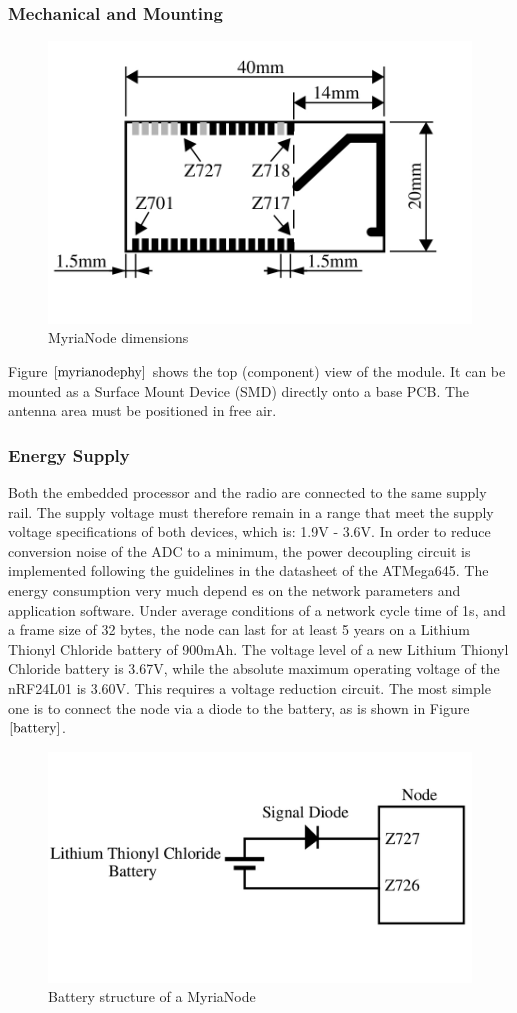 \documentclass[a4paper,10pt]{report}
\begin{document}
\subsubsection{Mechanical and Mounting}
\begin{figure}[!h]
 \centering
 \includegraphics[width= 0.7 \textwidth]{myrianodephy}
 \caption{MyriaNode dimensions}
 \label{myrianodephy}
\end{figure}
Figure $\ref{myrianodephy}$ shows the top (component) view of the module. It can be mounted as a Surface Mount Device (SMD) directly onto a base PCB. The antenna area must be positioned in free air.
\subsubsection{Energy Supply}
Both the embedded processor and the radio are connected to the same supply rail. The supply voltage must therefore remain in a range that meet the supply voltage specifications of both devices, which is: 1.9V - 3.6V. \newline
In order to reduce conversion noise of the ADC to a minimum, the power decoupling circuit is implemented following the guidelines in the datasheet of the ATMega645. \newline
The energy consumption very much depend es on the network parameters and application software. Under average conditions of a network cycle time of 1s, and a frame size of 32 bytes, the node can last for at least 5 years on a Lithium Thionyl Chloride battery of 900mAh. \newline
The voltage level of a new Lithium Thionyl Chloride battery is 3.67V, while the absolute maximum operating voltage of the nRF24L01 is 3.60V. This requires a voltage reduction circuit. The most simple one is to connect the node via a diode to the battery, as is shown in Figure $\ref{battery}$.
\begin{figure}[!h]
 \centering
 \includegraphics[width = 0.5 \textwidth]{battery}
 \caption{Battery structure of a MyriaNode}
 \label{battery}
\end{figure}
\end{document}
